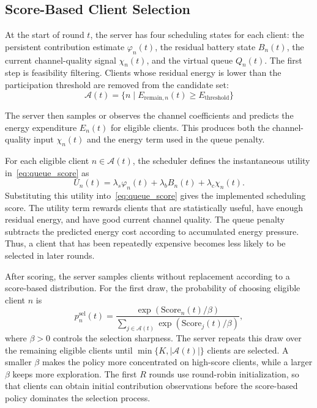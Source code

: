 \documentclass[journal]{IEEEtran}
\begin{document}
\subsection{Score-Based Client Selection}

At the start of round $t$, the server has four scheduling states for each client: the persistent contribution estimate $\varphi_n(t)$, the residual battery state $B_n(t)$, the current channel-quality signal $\chi_n(t)$, and the virtual queue $Q_n(t)$. The first step is feasibility filtering. Clients whose residual energy is lower than the participation threshold are removed from the candidate set:
\begin{equation}
\mathcal{A}(t) = \{n \mid E_{\text{remain},n}(t) \geq E_{\text{threshold}}\}
\end{equation}

The server then samples or observes the channel coefficients and predicts the energy expenditure $E_n(t)$ for eligible clients. This produces both the channel-quality input $\chi_n(t)$ and the energy term used in the queue penalty.

For each eligible client $n \in \mathcal{A}(t)$, the scheduler defines the instantaneous utility in~\eqref{eq:queue_score} as
\begin{equation}
U_n(t)=\lambda_s\varphi_n(t)+\lambda_b B_n(t)+\lambda_c \chi_n(t).
\end{equation}
Substituting this utility into~\eqref{eq:queue_score} gives the implemented scheduling score. The utility term rewards clients that are statistically useful, have enough residual energy, and have good current channel quality. The queue penalty subtracts the predicted energy cost according to accumulated energy pressure. Thus, a client that has been repeatedly expensive becomes less likely to be selected in later rounds.

After scoring, the server samples clients without replacement according to a score-based distribution. For the first draw, the probability of choosing eligible client $n$ is
\begin{equation}
\label{eq:sel_prob}
p_n^{\mathrm{sel}}(t)
=\frac{\exp(\mathrm{Score}_n(t)/\beta)}
{\sum_{j\in\mathcal{A}(t)}\exp(\mathrm{Score}_j(t)/\beta)},
\end{equation}
where $\beta>0$ controls the selection sharpness. The server repeats this draw over the remaining eligible clients until $\min\{K,|\mathcal{A}(t)|\}$ clients are selected. A smaller $\beta$ makes the policy more concentrated on high-score clients, while a larger $\beta$ keeps more exploration. The first $R$ rounds use round-robin initialization, so that clients can obtain initial contribution observations before the score-based policy dominates the selection process.
\end{document}
